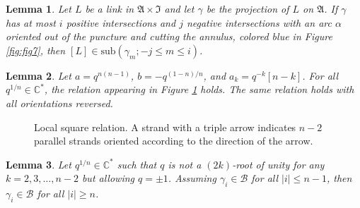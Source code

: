 \documentclass[10pt,a4paper]{amsart}
\newtheorem{lemma}{Lemma}
\newcommand{\C}{\mbb{C}}
\newcommand{\ann}{\mfrak{A}}
\newcommand{\basgen}{\mcal{B}}
\newcommand{\class}[1]{\left[#1\right]}
\newcommand{\intt}{\mfrak{I}}
\newcommand{\lp}{\left(}\newcommand{\rp}{\right)}
\newcommand{\mbb}[1]{\mathbb{#1}}
\newcommand{\mcal}[1]{\mathcal{#1}}
\newcommand{\mfrak}[1]{\mathfrak{#1}}
\newcommand{\mrm}[1]{\mathrm{#1}}
\newcommand{\qroot}{q^{1/n}}
\newcommand{\sC}{\C^\ast}
\newcommand{\sub}[1]{\mrm{sub}\lp#1\rp}
\begin{document}
\begin{lemma}\label{lem:refinement}
Let $L$ be a link in $\ann\times\intt$ and let $\gamma$ be the projection of $L$ on $\ann$.  If $\gamma$ has at most $i$ positive intersections and $j$ negative intersections with an arc $\alpha$ oriented out of the puncture and cutting the annulus, colored blue 
in Figure {\upshape\ref{fig:fig7}}, then $\class{L}\in\sub{\gamma_m;-j\leq m\leq i}$.  
\end{lemma}

\begin{lemma}\label{lem:square-lemma}
Let $a=q^{n(n-1)}$, $b=-q^{(1-n)/n}$, and $a_k=q^{-k}[n-k]$.  For all $\qroot\in\sC$, the relation appearing in Figure {\upshape\ref{fig:square-lemma}} holds.  The same relation holds with all orientations reversed.\end{lemma}

\begin{figure}[htb!]
\centering

\caption{Local square relation. A strand with a triple arrow indicates $n-2$ parallel strands oriented according to the direction of the arrow.}
\label{fig:square-lemma}
\end{figure}

\begin{lemma}\label{lem:inductionlargei}
Let $\qroot\in\sC$ such that $q$ is not a $(2k)$-root of unity for any $k=2,3,\dots,n-2$ but allowing $q=\pm1$.  Assuming $\gamma_i\in\basgen$ for all $|i|\leq n-1$, then $\gamma_i\in\basgen$ for all $|i|\geq n$.  
\end{lemma}
\end{document}
